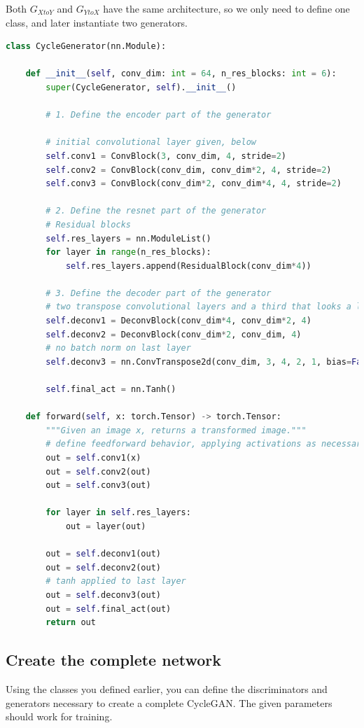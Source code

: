 Both \(G_{XtoY}\) and \(G_{YtoX}\) have the same architecture, so we
only need to define one class, and later instantiate two generators.
\begin{lstlisting}[language=Python]
class CycleGenerator(nn.Module):
    
    def __init__(self, conv_dim: int = 64, n_res_blocks: int = 6):
        super(CycleGenerator, self).__init__()

        # 1. Define the encoder part of the generator
        
        # initial convolutional layer given, below
        self.conv1 = ConvBlock(3, conv_dim, 4, stride=2)
        self.conv2 = ConvBlock(conv_dim, conv_dim*2, 4, stride=2)
        self.conv3 = ConvBlock(conv_dim*2, conv_dim*4, 4, stride=2)

        # 2. Define the resnet part of the generator
        # Residual blocks
        self.res_layers = nn.ModuleList()
        for layer in range(n_res_blocks):
            self.res_layers.append(ResidualBlock(conv_dim*4))

        # 3. Define the decoder part of the generator
        # two transpose convolutional layers and a third that looks a lot like the initial conv layer
        self.deconv1 = DeconvBlock(conv_dim*4, conv_dim*2, 4)
        self.deconv2 = DeconvBlock(conv_dim*2, conv_dim, 4)
        # no batch norm on last layer
        self.deconv3 = nn.ConvTranspose2d(conv_dim, 3, 4, 2, 1, bias=False)
        
        self.final_act = nn.Tanh()
        
    def forward(self, x: torch.Tensor) -> torch.Tensor:
        """Given an image x, returns a transformed image."""
        # define feedforward behavior, applying activations as necessary
        out = self.conv1(x)
        out = self.conv2(out)
        out = self.conv3(out)
        
        for layer in self.res_layers:
            out = layer(out)
        
        out = self.deconv1(out)
        out = self.deconv2(out)
        # tanh applied to last layer
        out = self.deconv3(out)
        out = self.final_act(out)
        return out
\end{lstlisting}

\subsection{Create the complete network}

Using the classes you defined earlier, you can define the discriminators
and generators necessary to create a complete CycleGAN. The given
parameters should work for training.\newline

